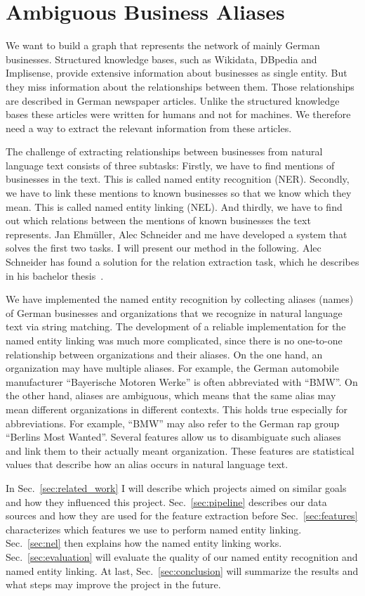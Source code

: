 \section{Ambiguous Business Aliases}
We want to build a graph that represents the network of mainly German businesses. Structured knowledge bases, such as Wikidata, DBpedia and Implisense, provide extensive information about businesses as single entity. But they miss information about the relationships between them. Those relationships are described in German newspaper articles. Unlike the structured knowledge bases these articles were written for humans and not for machines. We therefore need a way to extract the relevant information from these articles.

The challenge of extracting relationships between businesses from natural language text consists of three subtasks: Firstly, we have to find mentions of businesses in the text. This is called named entity recognition (NER). Secondly, we have to link these mentions to known businesses so that we know which they mean. This is called named entity linking (NEL). And thirdly, we have to find out which relations between the mentions of known businesses the text represents.
Jan Ehmüller, Alec Schneider and me have developed a system that solves the first two tasks. I will present our method in the following. Alec Schneider has found a solution for the relation extraction task, which he describes in his bachelor thesis~\cite{Alec}.

We have implemented the named entity recognition by collecting aliases (names) of German businesses and organizations that we recognize in natural language text via string matching. The development of a reliable implementation for the named entity linking was much more complicated, since there is no one-to-one relationship between organizations and their aliases. On the one hand, an organization may have multiple aliases. For example, the German automobile manufacturer "`Bayerische Motoren Werke"' is often abbreviated with "`BMW"'. On the other hand, aliases are ambiguous, which means that the same alias may mean different organizations in different contexts. This holds true especially for abbreviations. For example, "`BMW"' may also refer to the German rap group "`Berlins Most Wanted"'.
Several features allow us to disambiguate such aliases and link them to their actually meant organization. These features are statistical values that describe how an alias occurs in natural language text.

In Sec.~\ref{sec:related_work} I will describe which projects aimed on similar goals and how they influenced this project. Sec.~\ref{sec:pipeline} describes our data sources and how they are used for the feature extraction before Sec.~\ref{sec:features} characterizes which features we use to perform named entity linking. Sec.~\ref{sec:nel} then explains how the named entity linking works. Sec.~\ref{sec:evaluation} will evaluate the quality of our named entity recognition and named entity linking. At last, Sec.~\ref{sec:conclusion} will summarize the results and what steps may improve the project in the future.